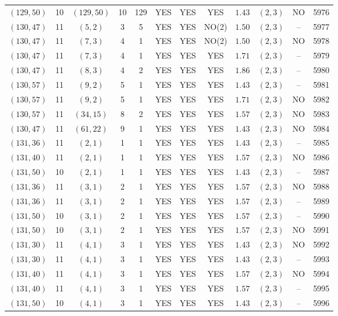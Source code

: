 \begin{longtable}{|c|c|c|c|c|c|c|c|c|c|c|c|}
$(129,50)$ & 10 & $(129,50)$ & 10 & 129 & YES & YES & YES & $1.43$ & $(2,3)$ & NO & 5976\\
$(130,47)$ & 11 & $(5,2)$ & 3 & 5 & YES & YES & NO(2) & $1.50$ & $(2,3)$ & -- & 5977\\
$(130,47)$ & 11 & $(7,3)$ & 4 & 1 & YES & YES & NO(2) & $1.50$ & $(2,3)$ & NO & 5978\\
$(130,47)$ & 11 & $(7,3)$ & 4 & 1 & YES & YES & YES & $1.71$ & $(2,3)$ & -- & 5979\\
$(130,47)$ & 11 & $(8,3)$ & 4 & 2 & YES & YES & YES & $1.86$ & $(2,3)$ & -- & 5980\\
$(130,57)$ & 11 & $(9,2)$ & 5 & 1 & YES & YES & YES & $1.43$ & $(2,3)$ & -- & 5981\\
$(130,57)$ & 11 & $(9,2)$ & 5 & 1 & YES & YES & YES & $1.71$ & $(2,3)$ & NO & 5982\\
$(130,57)$ & 11 & $(34,15)$ & 8 & 2 & YES & YES & YES & $1.57$ & $(2,3)$ & NO & 5983\\
$(130,47)$ & 11 & $(61,22)$ & 9 & 1 & YES & YES & YES & $1.43$ & $(2,3)$ & NO & 5984\\
$(131,36)$ & 11 & $(2,1)$ & 1 & 1 & YES & YES & YES & $1.43$ & $(2,3)$ & -- & 5985\\
$(131,40)$ & 11 & $(2,1)$ & 1 & 1 & YES & YES & YES & $1.57$ & $(2,3)$ & NO & 5986\\
$(131,50)$ & 10 & $(2,1)$ & 1 & 1 & YES & YES & YES & $1.43$ & $(2,3)$ & -- & 5987\\
$(131,36)$ & 11 & $(3,1)$ & 2 & 1 & YES & YES & YES & $1.57$ & $(2,3)$ & NO & 5988\\
$(131,36)$ & 11 & $(3,1)$ & 2 & 1 & YES & YES & YES & $1.57$ & $(2,3)$ & -- & 5989\\
$(131,50)$ & 10 & $(3,1)$ & 2 & 1 & YES & YES & YES & $1.57$ & $(2,3)$ & -- & 5990\\
$(131,50)$ & 10 & $(3,1)$ & 2 & 1 & YES & YES & YES & $1.57$ & $(2,3)$ & NO & 5991\\
$(131,30)$ & 11 & $(4,1)$ & 3 & 1 & YES & YES & YES & $1.43$ & $(2,3)$ & NO & 5992\\
$(131,30)$ & 11 & $(4,1)$ & 3 & 1 & YES & YES & YES & $1.43$ & $(2,3)$ & -- & 5993\\
$(131,40)$ & 11 & $(4,1)$ & 3 & 1 & YES & YES & YES & $1.57$ & $(2,3)$ & NO & 5994\\
$(131,40)$ & 11 & $(4,1)$ & 3 & 1 & YES & YES & YES & $1.57$ & $(2,3)$ & -- & 5995\\
$(131,50)$ & 10 & $(4,1)$ & 3 & 1 & YES & YES & YES & $1.43$ & $(2,3)$ & -- & 5996\\

\end{longtable}

